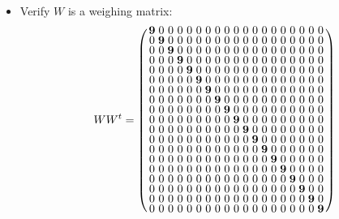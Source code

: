\documentclass{beamer}
\begin{document}
\begin{frame}

  \begin{itemize}
  \item Verify $W$ is a weighing matrix:
    \[
      WW^t=
      \arraycolsep=1.25pt\def\arraystretch{0.625}
      \left(
        \begin{array}{ccccccccccccccccccc}
          \mathbf{9}&0&0&0&0&0&0&0&0&0&0&0&0&0&0&0&0&0&0\\
          0&\mathbf{9}&0&0&0&0&0&0&0&0&0&0&0&0&0&0&0&0&0\\
          0&0&\mathbf{9}&0&0&0&0&0&0&0&0&0&0&0&0&0&0&0&0\\
          0&0&0&\mathbf{9}&0&0&0&0&0&0&0&0&0&0&0&0&0&0&0\\
          0&0&0&0&\mathbf{9}&0&0&0&0&0&0&0&0&0&0&0&0&0&0\\
          0&0&0&0&0&\mathbf{9}&0&0&0&0&0&0&0&0&0&0&0&0&0\\
          0&0&0&0&0&0&\mathbf{9}&0&0&0&0&0&0&0&0&0&0&0&0\\
          0&0&0&0&0&0&0&\mathbf{9}&0&0&0&0&0&0&0&0&0&0&0\\
          0&0&0&0&0&0&0&0&\mathbf{9}&0&0&0&0&0&0&0&0&0&0\\
          0&0&0&0&0&0&0&0&0&\mathbf{9}&0&0&0&0&0&0&0&0&0\\
          0&0&0&0&0&0&0&0&0&0&\mathbf{9}&0&0&0&0&0&0&0&0\\
          0&0&0&0&0&0&0&0&0&0&0&\mathbf{9}&0&0&0&0&0&0&0\\
          0&0&0&0&0&0&0&0&0&0&0&0&\mathbf{9}&0&0&0&0&0&0\\
          0&0&0&0&0&0&0&0&0&0&0&0&0&\mathbf{9}&0&0&0&0&0\\
          0&0&0&0&0&0&0&0&0&0&0&0&0&0&\mathbf{9}&0&0&0&0\\
          0&0&0&0&0&0&0&0&0&0&0&0&0&0&0&\mathbf{9}&0&0&0\\
          0&0&0&0&0&0&0&0&0&0&0&0&0&0&0&0&\mathbf{9}&0&0\\
          0&0&0&0&0&0&0&0&0&0&0&0&0&0&0&0&0&\mathbf{9}&0\\
          0&0&0&0&0&0&0&0&0&0&0&0&0&0&0&0&0&0&\mathbf{9}\\
        \end{array}
      \right)
    \]
  \end{itemize}

\end{frame}
\end{document}
